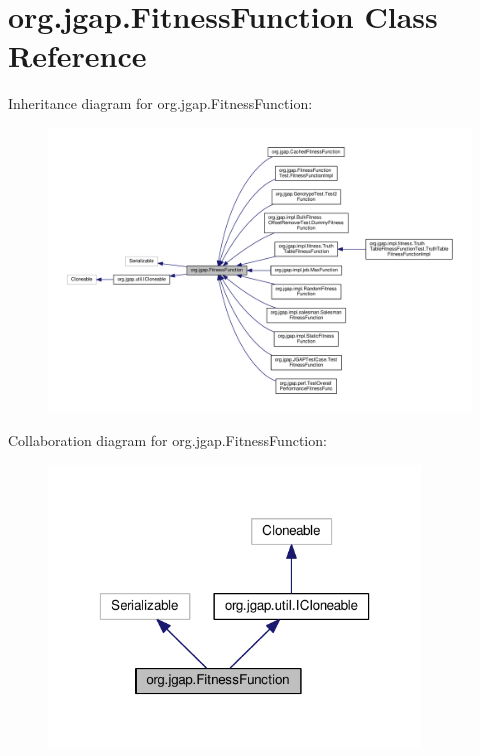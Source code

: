 \hypertarget{classorg_1_1jgap_1_1_fitness_function}{\section{org.\-jgap.\-Fitness\-Function Class Reference}
\label{classorg_1_1jgap_1_1_fitness_function}
}


Inheritance diagram for org.\-jgap.\-Fitness\-Function\-:
\nopagebreak
\begin{figure}[H]
\begin{center}
\leavevmode
\includegraphics[width=350pt]{classorg_1_1jgap_1_1_fitness_function__inherit__graph}
\end{center}
\end{figure}


Collaboration diagram for org.\-jgap.\-Fitness\-Function\-:
\nopagebreak
\begin{figure}[H]
\begin{center}
\leavevmode
\includegraphics[width=280pt]{classorg_1_1jgap_1_1_fitness_function__coll__graph}
\end{center}
\end{figure}
